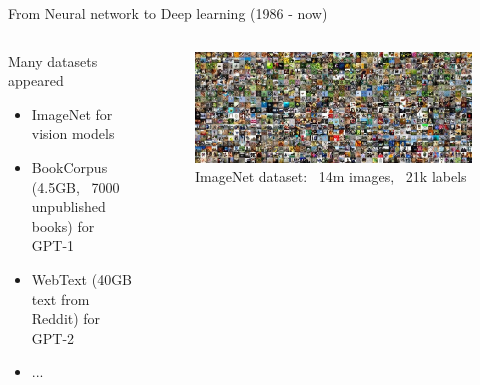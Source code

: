 \begin{frame}{From Neural network to Deep learning (1986 - now)}

    \begin{columns}
        \begin{column}{0.5\textwidth}
            \alert{Many datasets appeared}
            \begin{itemize}
                \item ImageNet for vision models
                \item BookCorpus (4.5GB, ~7000 unpublished books) for GPT-1
                \item WebText (40GB text from Reddit) for GPT-2
                \item ...
            \end{itemize}
        \end{column}

        \begin{column}{0.5\textwidth}
            \begin{figure}
                \centering
                \includegraphics[width=\linewidth]{img/imagenet.png}
                \caption{ImageNet dataset: ~14m images, ~21k labels}
            \end{figure}
        \end{column}
    \end{columns}
\end{frame}

